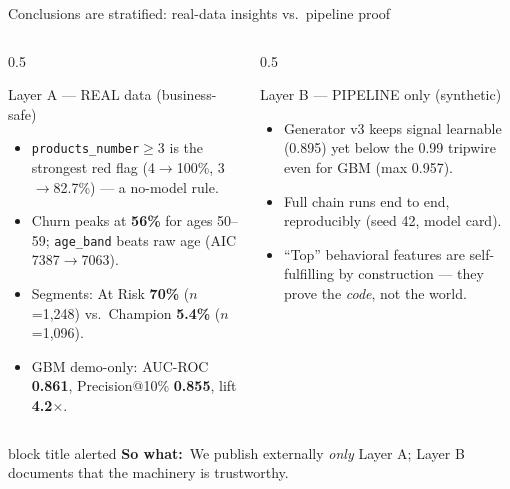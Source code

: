 \documentclass[11pt,aspectratio=169]{beamer}
\newcommand{\sowhat}[1]{%
  \vspace{2pt}\begin{beamercolorbox}[wd=\textwidth,sep=4pt,rounded=true]{block title alerted}%
  \footnotesize\textbf{So what:}~#1\end{beamercolorbox}}
\begin{document}
\begin{frame}{Conclusions are stratified: real-data insights vs.\ pipeline proof}
  \begin{columns}[T]
    \begin{column}{0.5\textwidth}
      \begin{exampleblock}{\small Layer A --- REAL data (business-safe)}
        \footnotesize
        \begin{itemize}
          \item \texttt{products\_number}\(\geq\)3 is the strongest red flag (4\(\to\)100\%, 3\(\to\)82.7\%) --- a no-model rule.
          \item Churn peaks at \textbf{56\%} for ages 50--59; \texttt{age\_band} beats raw age (AIC 7387\(\to\)7063).
          \item Segments: At Risk \textbf{70\%} (\(n\)=1,248) vs.\ Champion \textbf{5.4\%} (\(n\)=1,096).
          \item GBM demo-only: AUC-ROC \textbf{0.861}, Precision@10\% \textbf{0.855}, lift \textbf{4.2\(\times\)}.
        \end{itemize}
      \end{exampleblock}
    \end{column}
    \begin{column}{0.5\textwidth}
      \begin{alertblock}{\small Layer B --- PIPELINE only (synthetic)}
        \footnotesize
        \begin{itemize}
          \item Generator v3 keeps signal learnable (0.895) yet below the 0.99 tripwire even for GBM (max 0.957).
          \item Full chain runs end to end, reproducibly (seed 42, model card).
          \item ``Top'' behavioral features are self-fulfilling by construction --- they prove the \emph{code}, not the world.
        \end{itemize}
      \end{alertblock}
    \end{column}
  \end{columns}
  \sowhat{We publish externally \emph{only} Layer A; Layer B documents that the machinery is trustworthy.}
\end{frame}
\end{document}

